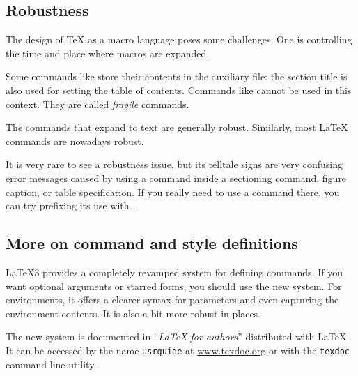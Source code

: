 %
%
\subsection{Robustness}\label{sec:robustness}

The design of \TeX{} as a macro language poses some challenges.
One is controlling the time and place where macros are expanded.

Some commands like  store their contents in the auxiliary file:
the section title is also used for setting the table of contents.
Commands like  cannot be used in this context.
They are called \emph{fragile} commands.

The commands that expand to text are generally robust.
Similarly, most \LaTeX{} commands are nowadays robust.

It is very rare to see a robustness issue,
but its telltale signs are very confusing error messages
caused by using a command inside a sectioning command, figure caption, or table specification.
If you really need to use a command there,
you can try prefixing its use with .


%
%
\subsection{More on command and style definitions}\label{sec:latex3 commands}

\LaTeX3 provides a completely revamped system for defining commands.
If you want optional arguments or starred forms,
you should use the new system.
For environments, it offers a clearer syntax for parameters
and even capturing the environment contents.
It is also a bit more robust in places.

The new system is documented in ``\emph{\LaTeX{} for authors}'' distributed with \LaTeX.
It can be accessed by the name \texttt{usrguide} at \url{www.texdoc.org}
or with the \verb|texdoc| command-line utility.


